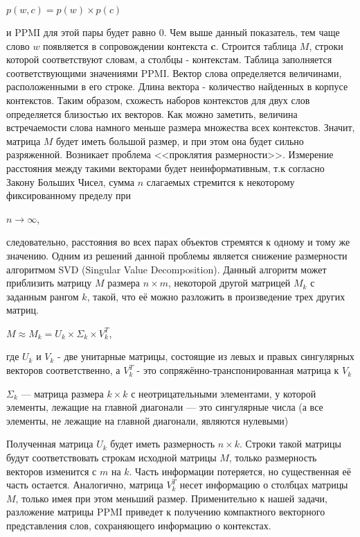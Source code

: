 $p(w, c) = p(w) \times p(c)$

и PPMI для этой пары будет равно
0. Чем выше данный показатель, тем чаще слово \textbf{$w$} появляется в сопровождении
контекста \textbf{c}.
Строится таблица $M$, строки которой соответствуют словам, а столбцы - контекстам.
Таблица заполняется соответствующими значениями PPMI. Вектор слова определяется
величинами, расположенными в его строке. Длина вектора - количество найденных в
корпусе контекстов. Таким образом, схожесть наборов контекстов для двух слов
определяется близостью их векторов.
Как можно заметить, величина встречаемости слова намного меньше размера множества
всех контекстов. Значит, матрица $M$ будет иметь большой размер, и при этом она будет
сильно разряженной. Возникает проблема <<проклятия размерности>>. Измерение
расстояния между такими векторами будет неинформативным, т.к согласно Закону
Больших Чисел, сумма $n$ слагаемых стремится к некоторому фиксированному пределу при

$n \to \infty$, 

следовательно, расстояния во всех парах объектов стремятся к одному и тому же
значению.
Одним из решений данной проблемы является снижение размерности алгоритмом SVD
(Singular Value Decomposition). Данный алгоритм может приблизить матрицу $M$ размера $n \times m$, некоторой другой матрицей $M_k$ с заданным рангом $k$, такой, что её можно разложить в
произведение трех других матриц.

$M \approx M_k = U_k \times \Sigma_k \times V^T_k$,

где $U_k$ и $V_k$ - две унитарные матрицы, состоящие из левых и правых сингулярных
векторов соответственно, а $V^T_k$ - это сопряжённо-транспонированная матрица к $V_k$

$\Sigma_k$ — матрица размера $k \times k$ с неотрицательными элементами, у которой элементы,
лежащие на главной диагонали — это сингулярные числа (а все элементы, не лежащие на
главной диагонали, являются нулевыми)

Полученная матрица $U_k$ будет иметь размерность $n \times k$. Строки такой матрицы будут
соответствовать строкам исходной матрицы $M$, только размерность векторов изменится с
$m$ на $k$. Часть информации потеряется, но существенная её часть остается. Аналогично,
матрица $V^T_k$ несет информацию о столбцах матрицы $M$, только имея при этом меньший
размер.
Применительно к нашей задачи, разложение матрицы PPMI приведет к получению
компактного векторного представления слов, сохраняющего информацию о контекстах.

